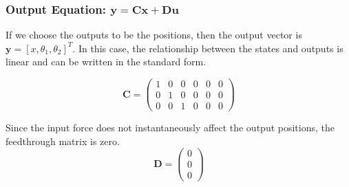 \documentclass[12pt]{article}
\begin{document}
%	
%	
%
%	
%
	
	\subsubsection{Output Equation: $\mathbf{y} = \mathbf{C}\mathbf{x} + \mathbf{D}\mathbf{u}$}
	If we choose the outputs to be the positions, then the output vector is $\mathbf{y} = [x, \theta_1, \theta_2]^T$. In this  case, the relationship between the states and outputs is linear and can be written in the standard form.
	

	\[
	\mathbf{C} =
	\begin{pmatrix}
		1 & 0 & 0 & 0 & 0 & 0 \\
		0 & 1 & 0 & 0 & 0 & 0 \\
		0 & 0 & 1 & 0 & 0 & 0
	\end{pmatrix}
	\]
	

	Since the input force does not instantaneously affect the output positions, the feedthrough matrix is zero.
	\[
	\mathbf{D} =
	\begin{pmatrix}
		0 \\
		0 \\
		0
	\end{pmatrix}
	\]
	
\end{document}

